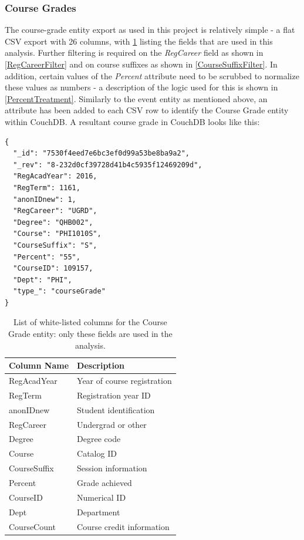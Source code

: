 \subsubsection*{Course Grades}
The course-grade entity export as used in this project is relatively simple - a flat CSV export with 26 columns, with \ref{Grades Columns} listing the fields that are used in this analysis. Further filtering is required on the \textit{RegCareer} field as shown in \ref{RegCareerFilter} and on course suffixes as shown in \ref{CourseSuffixFilter}. In addition, certain values of the \textit{Percent} attribute need to be scrubbed to normalize these values as numbers - a description of the logic used for this is shown in \ref{PercentTreatment}. Similarly to the event entity as mentioned above, an attribute has been added to each CSV row to identify the Course Grade entity within CouchDB. A resultant course grade in CouchDB looks like this:

\begin{verbatim}
{
  "_id": "7530f4eed7e6bc3ef0d99a53be8ba9a2",
  "_rev": "8-232d0cf39728d41b4c5935f12469209d",
  "RegAcadYear": 2016,
  "RegTerm": 1161,
  "anonIDnew": 1,
  "RegCareer": "UGRD",
  "Degree": "QHB002",
  "Course": "PHI1010S",
  "CourseSuffix": "S",
  "Percent": "55",
  "CourseID": 109157,
  "Dept": "PHI",
  "type_": "courseGrade"
}
\end{verbatim}

\begin{table}[]
  \centering
  \caption{List of white-listed columns for the Course Grade entity: only these fields are used in the analysis.}
  \label{Grades Columns}
  \begin{tabular}{ll}
    Column Name  & Description                 \\ \hline
    RegAcadYear  & Year of course registration \\
    RegTerm      & Registration year ID        \\
    anonIDnew    & Student identification      \\
    RegCareer    & Undergrad or other          \\
    Degree       & Degree code                 \\
    Course       & Catalog ID                  \\
    CourseSuffix & Session information         \\
    Percent      & Grade achieved              \\
    CourseID     & Numerical ID                \\
    Dept         & Department                  \\
    CourseCount  & Course credit information   \\ \hline
  \end{tabular}
\end{table}


